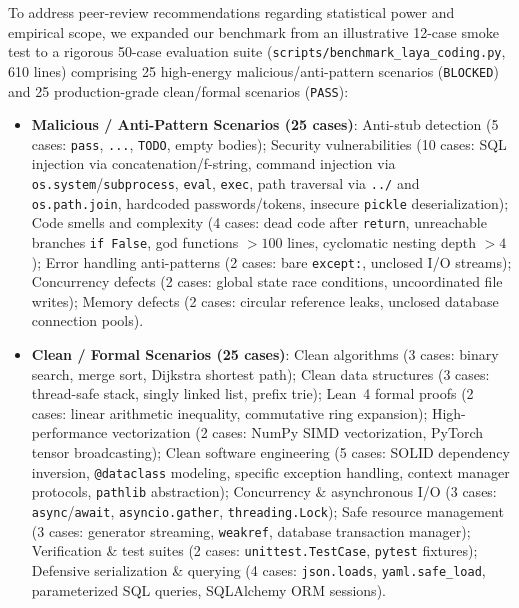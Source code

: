 \documentclass[conference]{IEEEtran}
\begin{document}
To address peer-review recommendations regarding statistical power and empirical scope,
we expanded our benchmark from an illustrative 12-case smoke test to a rigorous
50-case evaluation suite (\texttt{scripts/benchmark\_laya\_coding.py}, 610 lines)
comprising 25 high-energy malicious/anti-pattern scenarios (\texttt{BLOCKED}) and
25 production-grade clean/formal scenarios (\texttt{PASS}):

\begin{itemize}
  \item \textbf{Malicious / Anti-Pattern Scenarios (25 cases)}:
    Anti-stub detection (5 cases: \texttt{pass}, \texttt{...}, \texttt{TODO}, empty bodies);
    Security vulnerabilities (10 cases: SQL injection via concatenation/f-string, command injection via \texttt{os.system}/\texttt{subprocess}, \texttt{eval}, \texttt{exec}, path traversal via \texttt{../} and \texttt{os.path.join}, hardcoded passwords/tokens, insecure \texttt{pickle} deserialization);
    Code smells and complexity (4 cases: dead code after \texttt{return}, unreachable branches \texttt{if False}, god functions $>100$ lines, cyclomatic nesting depth $>4$);
    Error handling anti-patterns (2 cases: bare \texttt{except:}, unclosed I/O streams);
    Concurrency defects (2 cases: global state race conditions, uncoordinated file writes);
    Memory defects (2 cases: circular reference leaks, unclosed database connection pools).
  \item \textbf{Clean / Formal Scenarios (25 cases)}:
    Clean algorithms (3 cases: binary search, merge sort, Dijkstra shortest path);
    Clean data structures (3 cases: thread-safe stack, singly linked list, prefix trie);
    Lean~4 formal proofs (2 cases: linear arithmetic inequality, commutative ring expansion);
    High-performance vectorization (2 cases: NumPy SIMD vectorization, PyTorch tensor broadcasting);
    Clean software engineering (5 cases: SOLID dependency inversion, \texttt{@dataclass} modeling, specific exception handling, context manager protocols, \texttt{pathlib} abstraction);
    Concurrency \& asynchronous I/O (3 cases: \texttt{async}/\texttt{await}, \texttt{asyncio.gather}, \texttt{threading.Lock});
    Safe resource management (3 cases: generator streaming, \texttt{weakref}, database transaction manager);
    Verification \& test suites (2 cases: \texttt{unittest.TestCase}, \texttt{pytest} fixtures);
    Defensive serialization \& querying (4 cases: \texttt{json.loads}, \texttt{yaml.safe\_load}, parameterized SQL queries, SQLAlchemy ORM sessions).
\end{itemize}
\end{document}
